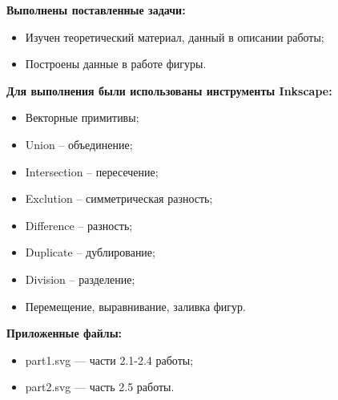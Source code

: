 
\textbf{Выполнены поставленные задачи:}
\begin{itemize}
    \item Изучен теоретический материал, данный в описании работы;
    \item Построены данные в работе фигуры.
\end{itemize}
\hspace{0pt}

\textbf{Для выполнения были использованы инструменты Inkscape:}
\begin{itemize}
    \item Векторные примитивы;
    \item Union -- объединение;
    \item Intersection -- пересечение;
    \item Exclution -- симметрическая разность;
    \item Difference -- разность;
    \item Duplicate -- дублирование;
    \item Division -- разделение;
    \item Перемещение, выравнивание, заливка фигур.
\end{itemize}
\hspace{0pt}

\textbf{Приложенные файлы:}
\begin{itemize}
    \item part1.svg --- части 2.1-2.4 работы;
    \item part2.svg --- часть 2.5 работы.
\end{itemize}


